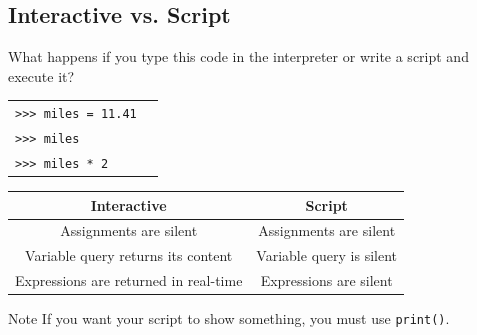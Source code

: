 \documentclass[t,handout,9pt]{beamer}
\begin{document}
\subsection{Interactive vs. Script}
\begin{frame}
\vfill
What happens if you type this code in the interpreter or write a script and execute it?\\
\begin{table}[]
\begin{tabular}{ll}
\texttt{>{}>{}> miles = 11.41} & \\
\texttt{>{}>{}> miles} & \\
\texttt{>{}>{}> miles * 2} & \\
\end{tabular}
\end{table}
\begin{table}[]
\begin{tabular}{@{}cc@{}}
\toprule
\textbf{Interactive}                  & \textbf{Script}          \\ \midrule
Assignments are silent                & Assignments are silent   \\
Variable query returns its content    & Variable query is silent \\
Expressions are returned in real-time & Expressions are silent   \\ \bottomrule
\end{tabular}
\end{table}
\begin{block}{Note}
If you want your script to show something, you must use \texttt{print()}.
\end{block}
\vfill
\end{frame}
%
\end{document}
